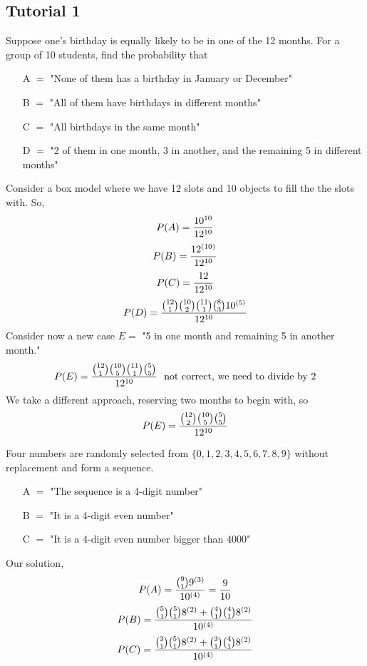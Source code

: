 \documentclass[english, 11pt]{article}
\begin{document}
   \subsection{Tutorial 1}

  \begin{exmp}
    Suppose one's birthday is equally likely to be in one of the 12 months. For a group of 10 students, find the probability that
    \begin{itemize}
      \item[A] $=$ "None of them has a birthday in January or December"
      \item[B] $=$ "All of them have birthdays in different months"
      \item[C] $=$ "All birthdays in the same month"
      \item[D] $=$ "2 of them in one month, 3 in another, and the remaining 5 in different months"
    \end{itemize}
    Consider a box model where we have 12 slots and 10 objects to fill the the slots with. So,
    \[ P(A) = \frac{10^{10}}{12^{10}} \]
    \[ P(B) = \frac{12^{(10)}}{12^{10}} \]
    \[ P(C) = \frac{12}{12^{10}} \]
    \[ P(D) = \frac{{12 \choose 1} {10 \choose 2} {11 \choose 1} {8 \choose 3} 10^{(5)}}{12^{10}} \]
    Consider now a new case $E =$ "5 in one month and remaining 5 in another month."
    \[ P(E) = \frac{{12 \choose 1} {10 \choose 5} {11 \choose 1} {5 \choose 5} }{12^{10}} \mbox { \ not correct, we need to divide by 2} \]
    We take a different approach, reserving two months to begin with, so
    \[ P(E) = \frac{{12 \choose 2} {10 \choose 5} {5 \choose 5}}{12^{10}} \]
  \end{exmp}

  \begin{exmp}
    Four numbers are randomly selected from $\{ 0,1,2,3,4,5,6,7,8,9 \}$ without replacement and form a sequence.
    \begin{itemize}
      \item[A] $=$ "The sequence is a 4-digit number"
      \item[B] $=$ "It is a 4-digit even number"
      \item[C] $=$ "It is a 4-digit even number bigger than 4000"
    \end{itemize}
    Our solution,
    \[ P(A) = \frac{{9 \choose 1}9^{(3)}}{10^{(4)}} = \frac{9}{10} \]
    \[ P(B) = \frac{{5 \choose 1}{5 \choose 1}8^{(2)} + {4 \choose 1}{4 \choose 1}8^{(2)}}{10^{(4)}} \]
    \[ P(C) = \frac{{3 \choose 1}{5 \choose 1}8^{(2)} + {3 \choose 1}{4 \choose 1}8^{(2)}}{10^{(4)}} \]
  \end{exmp}
\end{document}
